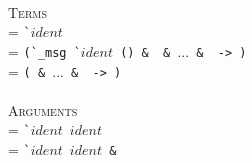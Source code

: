 \documentclass{article}
\begin{document}
\\\textsc{Terms}\\
 = \verb|`|$ident$~\\
 = \verb|(`_msg `|$ident$\verb| () & |\verb| & |$...$\verb| & |\verb| -> |\verb|)|\\
 = \verb|(|\verb| & |$...$\verb| & |\verb| -> |\verb|)|\\
\\\textsc{Arguments}\\
 = \verb|`|$ident$~$ident$\\
 = \verb|`|$ident$~$ident$\verb| & |\\
\end{document}
